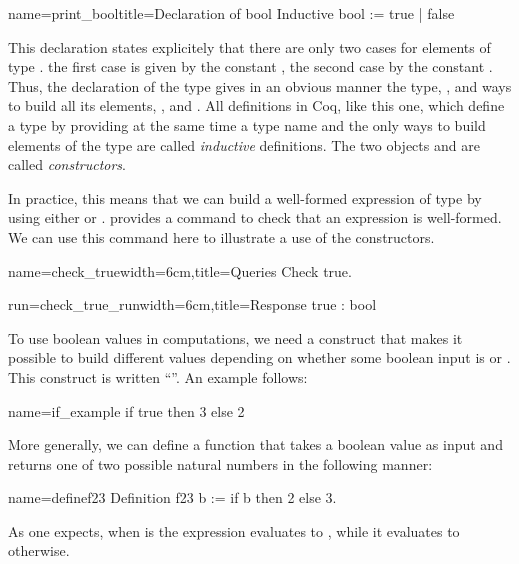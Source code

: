\begin{coq}{name=print_bool}{title=Declaration of bool}
Inductive bool := true | false
\end{coq}
This declaration states explicitely that there are only two cases for
elements of type .  the first case is given by the constant
, the second case by the constant .  Thus, the
declaration of the type gives in an obvious manner the type, ,
and ways to build all its elements, , and .  All definitions
in Coq, like this one, which define a type by providing at the same time a type
name and the only ways to build elements of the type are called {\em inductive}
definitions.  The two objects  and  are called
\emph{constructors}.

In practice, this means that we can build a well-formed expression of
type  by using either  or .  \Coq{} provides a
command to check that an expression is well-formed.  We can use this
command here to illustrate a use of the constructors.

\begin{coq}{name=check_true}{width=6cm,title=Queries}
Check true.
\end{coq}
\begin{coqout}{run=check_true_run}{width=6cm,title=Response}
true : bool
\end{coqout}

To use boolean values in computations, we need a construct that makes
it possible to build different values depending on whether some
boolean input is  or .  This construct is written
``''.  An example follows:

\begin{coq}{name=if_example}{}
if true then 3 else 2
\end{coq}
More generally, we can define a function that takes a boolean value as
input and returns one of two possible natural numbers in the following
manner:

\begin{coq}{name=definef23}{}
Definition f23 b := if b then 2 else 3.
\end{coq}

As one expects, when  is  the expression
 evaluates to , while it evaluates to  otherwise.

